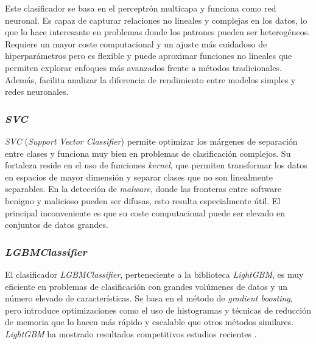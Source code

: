 Este clasificador se basa en el perceptrón multicapa y funciona como red neuronal. Es capaz de capturar relaciones no lineales y complejas en los datos, lo que lo hace interesante en problemas donde los patrones pueden ser heterogéneos. Requiere un mayor coste computacional y un ajuste más cuidadoso de hiperparámetros pero es flexible y puede aproximar funciones no lineales que permiten explorar enfoques más avanzados frente a métodos tradicionales. Además, facilita analizar la diferencia de rendimiento entre modelos simples y redes neuronales.

\subsubsection{\textit{SVC}}
\label{subsubsec:svc}

\textit{SVC} (\textit{Support Vector Classifier}) permite optimizar los márgenes de separación entre clases y funciona muy bien en problemas de clasificación complejos. Su fortaleza reside en el uso de funciones \textit{kernel}, que permiten transformar los datos en espacios de mayor dimensión y separar clases que no son linealmente separables. En la detección de \textit{malware}, donde las fronteras entre software benigno y malicioso pueden ser difusas, esto resulta especialmente útil. El principal inconveniente es que su coste computacional puede ser elevado en conjuntos de datos grandes.

\subsubsection{\textit{LGBMClassifier}}
\label{subsubsec:lgbmclassifier}

El clasificador \textit{LGBMClassifier}, perteneciente a la biblioteca \textit{LightGBM}, es muy eficiente en problemas de clasificación con grandes volúmenes de datos y un número elevado de características. Se basa en el método de \textit{gradient boosting}, pero introduce optimizaciones como el uso de histogramas y técnicas de reducción de memoria que lo hacen más rápido y escalable que otros métodos similares. \textit{LightGBM} ha mostrado resultados competitivos estudios recientes \cite{estudio_lgbm}.
